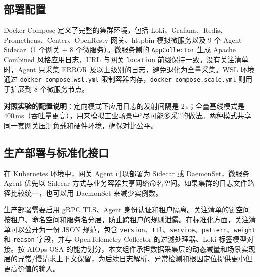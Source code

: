 \subsection{部署配置}
Docker Compose 定义了完整的集群环境，包括 Loki、Grafana、Redis、Prometheus、Center、OpenResty 网关、httpbin 模拟微服务以及 9 个 Agent Sidecar（1 个网关 + 8 个微服务）。微服务侧的 \texttt{AppCollector} 生成 Apache Combined 风格应用日志，URL 与网关 \texttt{location} 前缀保持一致。没有关注清单时，Agent 只采集 ERROR 及以上级别的日志，避免退化为全量采集。WSL 环境通过 \texttt{docker-compose.wsl.yml} 限制容器内存，\texttt{docker-compose.scale.yml} 则用于扩展到 8 个微服务节点。

\textbf{对照实验的配置说明}：定向模式下应用日志的发射间隔是 2\,s；全量基线模式是 400\,ms（吞吐量更高），用来模拟工业场景中``尽可能多采''的做法。两种模式共享同一套网关压测负载和硬件环境，确保对比公平。

\subsection{生产部署与标准化接口}
在 Kubernetes 环境中，网关 Agent 可以部署为 Sidecar 或 DaemonSet，微服务 Agent 优先以 Sidecar 方式与业务容器共享网络命名空间。如果集群的日志文件路径比较统一，也可以用 DaemonSet 来减少实例数。

生产部署需要启用 gRPC TLS、Agent 身份认证和租户隔离。关注清单的键空间按租户、命名空间和服务名分层，防止跨租户的规则泄露。在标准化方面，关注清单可以公开为一份 JSON 规范，包含 \texttt{version}、\texttt{ttl}、\texttt{service}、\texttt{pattern}、\texttt{weight} 和 \texttt{reason} 字段，并与 OpenTelemetry Collector 的过滤处理器、Loki 标签模型对接。按 AIOps-OSA 的能力划分，本文组件承担数据采集层的动态减量和场景实现层的异常/慢请求上下文保留，为后续日志解析、异常检测和根因定位提供更小但更高价值的输入。

